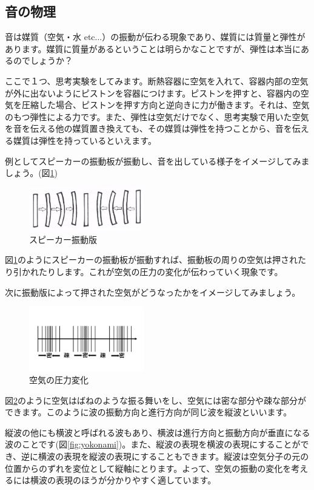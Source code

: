\documentclass[11pt,b5paper,papersize,dvipdfmx]{jsbook}
\begin{document}
\subsection{音の物理}
音は媒質（空気・水 etc...）の振動が伝わる現象であり、媒質には質量と弾性があります。媒質に質量があるということは明らかなことですが、弾性は本当にあるのでしょうか？\par
ここで１つ、思考実験をしてみます。断熱容器に空気を入れて、容器内部の空気が外に出ないようにピストンを容器につけます。ピストンを押すと、容器内の空気を圧縮した場合、ピストンを押す方向と逆向きに力が働きます。それは、空気のもつ弾性による力です。また、弾性は空気だけでなく、思考実験で用いた空気を音を伝える他の媒質置き換えても、その媒質は弾性を持つことから、音を伝える媒質は弾性を持っているといえます。\par
例としてスピーカーの振動板が振動し、音を出している様子をイメージしてみましょう。(図\ref{fig:spk})
\begin{figure}[H]
  \centering
  \includegraphics[width=5cm]{nsmr/img/supikasinndou.png}
  \caption{スピーカー振動版}
  \label{fig:spk}
\end{figure}
図\ref{fig:spk}のようにスピーカーの振動板が振動すれば、振動板の周りの空気は押されたり引かれたりします。これが空気の圧力の変化が伝わっていく現象です。\par
次に振動版によって押された空気がどうなったかをイメージしてみましょう。
\begin{figure}[H]
  \centering
  \includegraphics[width=5cm]{nsmr/img/slide4.png}
  \caption{空気の圧力変化}
  \label{fig:aturyoku}
\end{figure}
図\ref{fig:aturyoku}のように空気はばねのような振る舞いをし、空気には密な部分や疎な部分ができます。このように波の振動方向と進行方向が同じ波を縦波といいます。\par
縦波の他にも横波と呼ばれる波もあり、横波は進行方向と振動方向が垂直になる波のことです(図\ref{fig:yokonami})。また、縦波の表現を横波の表現にすることができ、逆に横波の表現を縦波の表現にすることもできます。縦波は空気分子の元の位置からのずれを変位として縦軸にとります。よって、空気の振動の変化を考えるには横波の表現のほうが分かりやすく適しています。
\end{document}
